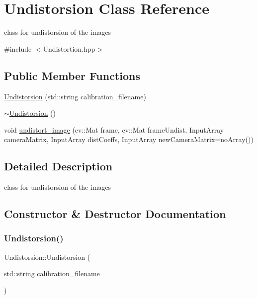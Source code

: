 \hypertarget{class_undistorsion}{}\section{Undistorsion Class Reference}
\label{class_undistorsion}


class for undistorsion of the images  




{\ttfamily \#include $<$Undistortion.\+hpp$>$}

\subsection*{Public Member Functions}
\begin{DoxyCompactItemize}
\item 
\mbox{\hyperlink{class_undistorsion_a447aceee5716c408a3ed662111525cf9}{Undistorsion}} (std\+::string calibration\+\_\+filename)
\item 
\mbox{\hyperlink{class_undistorsion_adc5adf65c7ee3f5668bafd8eeaf31eb4}{$\sim$\+Undistorsion}} ()
\item 
void \mbox{\hyperlink{class_undistorsion_a00c36a6d87702b119e87ca0ff003c92f}{undistort\+\_\+image}} (cv\+::\+Mat frame, cv\+::\+Mat frame\+Undist, Input\+Array camera\+Matrix, Input\+Array dist\+Coeffs, Input\+Array new\+Camera\+Matrix=no\+Array())
\end{DoxyCompactItemize}


\subsection{Detailed Description}
class for undistorsion of the images 

\subsection{Constructor \& Destructor Documentation}
\mbox{\label{class_undistorsion_a447aceee5716c408a3ed662111525cf9}} 
\subsubsection{\texorpdfstring{Undistorsion()}{Undistorsion()}}
{\footnotesize\ttfamily Undistorsion\+::\+Undistorsion (\begin{DoxyParamCaption}\item[{std\+::string}]{calibration\+\_\+filename }\end{DoxyParamCaption})}

